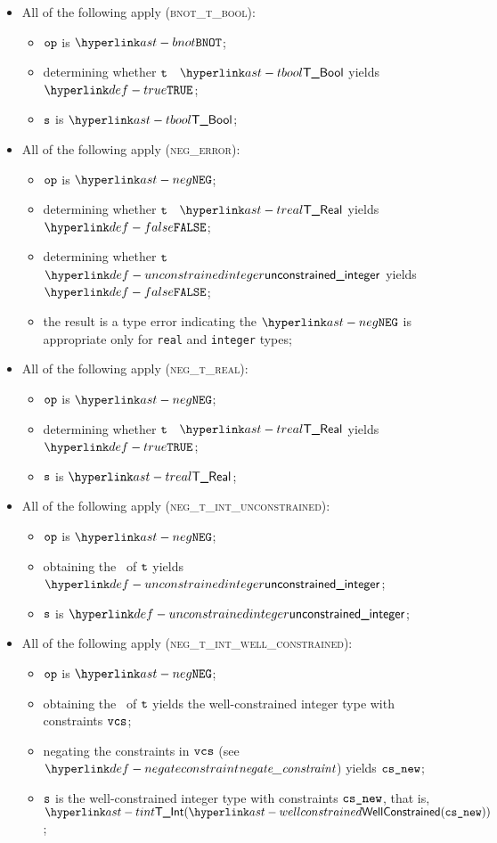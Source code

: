 \begin{itemize}
\item All of the following apply (\textsc{bnot\_t\_bool}):
  \begin{itemize}
    \item $\texttt{op}$ is $\BNOT$;
    \item determining whether $\texttt{t}$ \typesatisfies\ $\TBool$ yields $\True$\ProseOrTypeError;
    \item $\texttt{s}$ is $\TBool$;
  \end{itemize}

\item All of the following apply (\textsc{neg\_error}):
\begin{itemize}
  \item $\texttt{op}$ is $\NEG$;
  \item determining whether $\texttt{t}$ \typesatisfies\ $\TReal$ yields $\False$\ProseOrTypeError;
  \item determining whether $\texttt{t}$ \typesatisfies\ $\unconstrainedinteger$ yields $\False$\ProseOrTypeError;
  \item the result is a type error indicating the $\NEG$ is appropriate only for \texttt{real} and \texttt{integer} types;
\end{itemize}

\item All of the following apply (\textsc{neg\_t\_real}):
\begin{itemize}
  \item $\texttt{op}$ is $\NEG$;
  \item determining whether $\texttt{t}$ \typesatisfies\ $\TReal$ yields $\True$;
  \item $\texttt{s}$ is $\TReal$;
\end{itemize}

\item All of the following apply (\textsc{neg\_t\_int\_unconstrained}):
\begin{itemize}
  \item $\texttt{op}$ is $\NEG$;
  \item obtaining the \wellconstrainedstructure\ of $\texttt{t}$ yields $\unconstrainedinteger$\ProseOrTypeError;
  \item $\texttt{s}$ is $\unconstrainedinteger$;
\end{itemize}

\item All of the following apply (\textsc{neg\_t\_int\_well\_constrained}):
\begin{itemize}
  \item $\texttt{op}$ is $\NEG$;
  \item obtaining the \wellconstrainedstructure\ of $\texttt{t}$ yields the well-constrained integer type with constraints $\texttt{vcs}$\ProseOrTypeError;
  \item negating the constraints in $\texttt{vcs}$ (see $\negateconstraint$) yields $\texttt{cs\_new}$;
  \item $\texttt{s}$ is the well-constrained integer type with constraints $\texttt{cs\_new}$, that is, \\
  $\TInt(\wellconstrained(\vcsnew))$;
\end{itemize}


\end{itemize}
